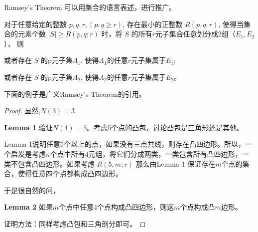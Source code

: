 \documentclass[oneside]{book}
\begin{document}
Ramsey's Theorem 可以用集合的语言表述，进行推广。
 {
    对于任意给定的整数 $p,q,r,(p,q \ge r)$, 存在最小的正整数 $R(p,q;r)$, 使得当集合的元素个数 $|S| \ge R(p,q;r)$ 时，将 $S$ 的所有$r$元子集合任意划分成2组（$E_1,E_2$）， 
    则 

    或者存在 $S$ 的p元子集$A_1$, 使得$A_1$的任意$r$元子集属于$E_1$;

    或者存在 $S$ 的p元子集$A_2$, 使得$A_2$的任意$r$元子集属于$E_2$。
}

下面的例子是广义Ramsey's Theorem的引用。


\begin{proof}
    显然,$N(3) = 3$. 

    {\bf Lemma 1} 验证$N(4) = 5$。考虑5个点的凸包，讨论凸包是三角形还是其他。
    
    Lemma 1说明任意5个以上的点，如果没有三点共线，则存在凸四边形。所以，一个启发是考虑$n$个点中所有4元组，将它们分成两类，一类包含所有凸四边形，一类不包含凸四边形。如果考虑 $R(5,m;r)$ 那么由Lemma 1
    保证存在$m$个点的集合，使得任意四个点都构成凸四边形。
    
    于是很自然的问，

    {\bf Lemma 2} 如果$m$个点中任意4个点构成凸四边形，则这$m$个点构成凸$m$边形。
    
    证明方法：同样考虑凸包和三角剖分即可。

\end{proof}


\end{document}
